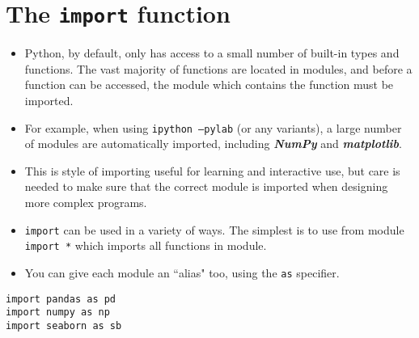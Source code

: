 \documentclass[Pydata.tex]{subfiles}
\begin{document}
 
\newpage
\Large\section{The \texttt{import} function}
\begin{itemize}
\item Python, by default, only has access to a small number of built-in types and functions. The vast majority of
functions are located in modules, and before a function can be accessed, the module which contains the
function must be imported. 

\item For example, when using \texttt{ipython --pylab} (or any variants), a large number
of modules are automatically imported, including \textbf{\textit{NumPy}} and \textbf{\textit{matplotlib}}.
\item This is style of importing useful
for learning and interactive use, but care is needed to make sure that the correct module is imported when
designing more complex programs.

\item \texttt{import} can be used in a variety of ways. The simplest is to use from module \texttt{import *} which imports
all functions in module.

\item You can give each module an ``alias" too, using the \texttt{as} specifier.
\end{itemize}

\begin{framed}
\begin{verbatim}
import pandas as pd
import numpy as np
import seaborn as sb
\end{verbatim}	
\end{framed}	
	
\end{document}
